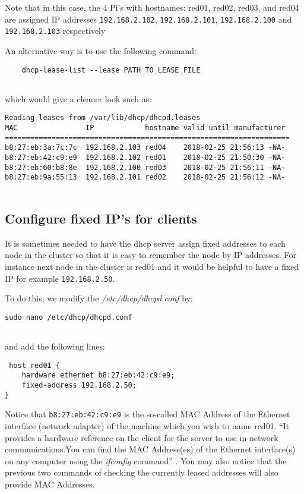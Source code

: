 Note that in this case, the 4 Pi's with hostnames: red01, red02, red03,
and red04 are assigned IP addresses \texttt{192.168.2.102},
\texttt{192.168.2.101}, \texttt{192.168.2.100} and
\texttt{192.168.2.103} respectively

An alternative way is to use the following command:

\begin{lstlisting}
    dhcp-lease-list --lease PATH_TO_LEASE_FILE
    
\end{lstlisting}

which would give a cleaner look such as:

\begin{lstlisting}
Reading leases from /var/lib/dhcp/dhcpd.leases
MAC                IP            hostname valid until manufacturer
===================================================================
b8:27:eb:3a:7c:7c  192.168.2.103 red04    2018-02-25 21:56:13 -NA-
b8:27:eb:42:c9:e9  192.168.2.102 red01    2018-02-25 21:50:30 -NA-
b8:27:eb:60:b8:8e  192.168.2.100 red03    2018-02-25 21:56:11 -NA-
b8:27:eb:9a:55:13  192.168.2.101 red02    2018-02-25 21:56:12 -NA-
    
\end{lstlisting}

\subsection{Configure fixed IP's for clients}

It is sometimes needed to have the dhcp server assign fixed addresses to
each node in the cluster so that it is easy to remember the node by IP
addresses. For instance next node in the cluster is red01 and it would
be helpful to have a fixed IP for example \texttt{192.168.2.50}.

To do this, we modify the \emph{/etc/dhcp/dhcpd.conf} by:

\begin{lstlisting}
sudo nano /etc/dhcp/dhcpd.conf
       
\end{lstlisting}

and add the following lines:

\begin{lstlisting}
 host red01 {
    hardware ethernet b8:27:eb:42:c9:e9;
    fixed-address 192.168.2.50;
}
\end{lstlisting}

Notice that \texttt{b8:27:eb:42:c9:e9} is the so-called MAC Address of
the Ethernet interface (network adapter) of the machine which you wish
to name red01. ``It provides a hardware reference on the client for the
server to use in network communications.You can find the MAC Address(es)
of the Ethernet interface(s) on any computer using the \emph{ifconfig}
command'' \cite{hid-sp18-405-tutorial-pidhcp-pdf}. You may also notice
that the previous two commands of checking the currently leased
addresses will also provide MAC Addresses.

